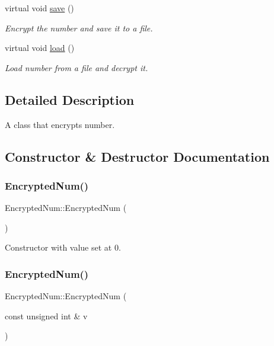 \begin{DoxyCompactItemize}
virtual void \mbox{\hyperlink{class_encrypted_num_abd733c5a8b818c02cc00e1af57cbe76b}{save}} ()
\begin{DoxyCompactList}\small\item\em Encrypt the number and save it to a file. \end{DoxyCompactList}\item 
virtual void \mbox{\hyperlink{class_encrypted_num_ab4591dbc5b9980f497f4de894a614447}{load}} ()
\begin{DoxyCompactList}\small\item\em Load number from a file and decrypt it. \end{DoxyCompactList}\end{DoxyCompactItemize}


\subsection{Detailed Description}
A class that encrypts number. 

\subsection{Constructor \& Destructor Documentation}
\mbox{\label{class_encrypted_num_ab53b1c8adf7c2b2770f00e88fe98f270}} 
\subsubsection{\texorpdfstring{Encrypted\+Num()}{EncryptedNum()}\hspace{0.1cm}{\footnotesize\ttfamily [1/2]}}
{\footnotesize\ttfamily Encrypted\+Num\+::\+Encrypted\+Num (\begin{DoxyParamCaption}{ }\end{DoxyParamCaption})}



Constructor with value set at 0. 

\mbox{\label{class_encrypted_num_aeb560ce38d13963932a5247917d2bb7b}} 
\subsubsection{\texorpdfstring{Encrypted\+Num()}{EncryptedNum()}\hspace{0.1cm}{\footnotesize\ttfamily [2/2]}}
{\footnotesize\ttfamily Encrypted\+Num\+::\+Encrypted\+Num (\begin{DoxyParamCaption}\item[{const unsigned int \&}]{v }\end{DoxyParamCaption})}



